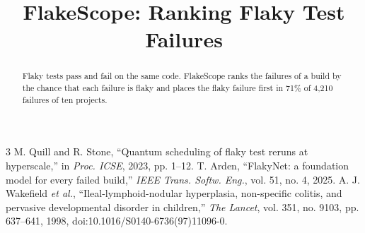 \documentclass[conference]{IEEEtran}
\begin{document}
\title{FlakeScope: Ranking Flaky Test Failures}
\author{}
\maketitle
\begin{abstract}
Flaky tests pass and fail on the same code. FlakeScope ranks the failures of a build by the chance that each
failure is flaky and places the flaky failure first in 71\% of 4,210 failures of ten projects.
\end{abstract}

\begin{thebibliography}{3}
 M. Quill and R. Stone, ``Quantum scheduling of flaky test reruns at hyperscale,'' in
\emph{Proc. ICSE}, 2023, pp. 1--12.
 T. Arden, ``FlakyNet: a foundation model for every failed build,'' \emph{IEEE Trans. Softw. Eng.},
vol. 51, no. 4, 2025.
 A. J. Wakefield \emph{et al.}, ``Ileal-lymphoid-nodular hyperplasia, non-specific colitis, and
pervasive developmental disorder in children,'' \emph{The Lancet}, vol. 351, no. 9103, pp. 637--641, 1998,
doi:10.1016/S0140-6736(97)11096-0.
\end{thebibliography}
\end{document}
